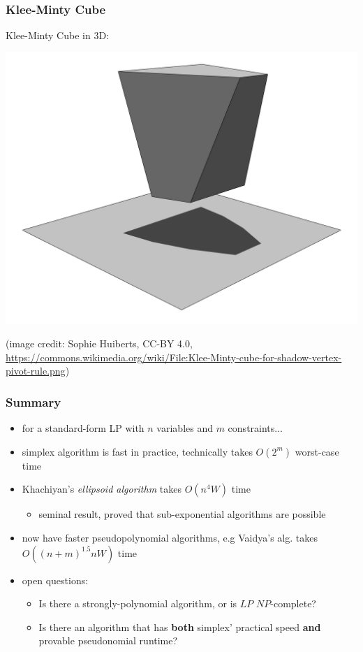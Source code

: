 \documentclass[10pt,aspectratio=169]{beamer}
\begin{document}
\begin{frame} \frametitle{Klee-Minty Cube}
\begin{center}
  Klee-Minty Cube in 3D:

  \includegraphics[scale=.07]{Klee-Minty-cube-for-shadow-vertex-pivot-rule.png}

  {\tiny
  (image credit: Sophie Huiberts, CC-BY 4.0, \url{https://commons.wikimedia.org/wiki/File:Klee-Minty-cube-for-shadow-vertex-pivot-rule.png})
  }
\end{center}
\end{frame}

\begin{frame} \frametitle{Summary}
  \begin{itemize}
    \item for a standard-form LP with $n$ variables and $m$ constraints...
    \item simplex algorithm is fast in practice, technically takes $O(2^m)$
      worst-case time
    \item Khachiyan's \emph{ellipsoid algorithm} takes $O(n^4 W)$ time
      \begin{itemize}
        \item seminal result, proved that sub-exponential algorithms are possible
      \end{itemize}
    \item now have faster pseudopolynomial algorithms, e.g Vaidya's alg.
      takes $O((n+m)^{1.5} nW )$ time
    \item open questions:
    \begin{itemize}
      \item Is there a strongly-polynomial algorithm, or is
      $LP$ $NP$-complete?
      \item Is there an algorithm that has \textbf{both}
      simplex' practical speed \textbf{and} provable pseudonomial runtime?
    \end{itemize}
  \end{itemize}
\end{frame}
\end{document}
